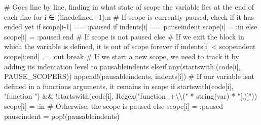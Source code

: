 \documentclass[
  letterpaper,
  DIV=11,
  numbers=noendperiod]{scrreprt}
\newenvironment{Shaded}{\begin{snugshade}}{\end{snugshade}}
\newcommand{\CommentTok}[1]{\textcolor[rgb]{0.37,0.37,0.37}{#1}}
\newcommand{\ControlFlowTok}[1]{\textcolor[rgb]{0.00,0.23,0.31}{#1}}
\newcommand{\FloatTok}[1]{\textcolor[rgb]{0.68,0.00,0.00}{#1}}
\newcommand{\FunctionTok}[1]{\textcolor[rgb]{0.28,0.35,0.67}{#1}}
\newcommand{\KeywordTok}[1]{\textcolor[rgb]{0.00,0.23,0.31}{#1}}
\newcommand{\NormalTok}[1]{\textcolor[rgb]{0.00,0.23,0.31}{#1}}
\newcommand{\OperatorTok}[1]{\textcolor[rgb]{0.37,0.37,0.37}{#1}}
\newcommand{\SpecialCharTok}[1]{\textcolor[rgb]{0.37,0.37,0.37}{#1}}
\newcommand{\StringTok}[1]{\textcolor[rgb]{0.13,0.47,0.30}{#1}}
\begin{document}
\begin{Shaded}
\begin{Highlighting}[]
    \CommentTok{\# Goes line by line, finding in what state of scope the variable lies at the end of each line}
    \ControlFlowTok{for}\NormalTok{ i }\OperatorTok{∈}\NormalTok{ (linedefined}\OperatorTok{+}\FloatTok{1}\NormalTok{)}\OperatorTok{:}\NormalTok{n}
        \CommentTok{\# If scope is currently paused, check if it has ended yet}
        \ControlFlowTok{if}\NormalTok{ scope[i}\OperatorTok{{-}}\FloatTok{1}\NormalTok{] }\OperatorTok{==} \OperatorTok{:}\NormalTok{paused}
            \ControlFlowTok{if}\NormalTok{ indents[i] }\OperatorTok{==}\NormalTok{ pauseindent}
\NormalTok{                scope[i] }\OperatorTok{=} \OperatorTok{:}\KeywordTok{in}
            \ControlFlowTok{else}
\NormalTok{                scope[i] }\OperatorTok{=} \OperatorTok{:}\NormalTok{paused}
            \ControlFlowTok{end}
        \CommentTok{\# If scope is not paused}
        \ControlFlowTok{else}
            \CommentTok{\# If we exit the block in which the variable is defined, it is out of scope forever}
            \ControlFlowTok{if}\NormalTok{ indents[i] }\OperatorTok{\textless{}}\NormalTok{ scopeindent}
\NormalTok{                scope[i}\OperatorTok{:}\KeywordTok{end}\NormalTok{] }\OperatorTok{.=} \OperatorTok{:}\NormalTok{out}
                \ControlFlowTok{break}
            \CommentTok{\# If we start a new scope, we need to track it by adding its indentation level to \textasciigrave{}pausableindents\textasciigrave{}}
            \ControlFlowTok{elseif} \FunctionTok{any}\NormalTok{(}\FunctionTok{startswith}\NormalTok{.(code[i], PAUSE\_SCOPERS))}
                \FunctionTok{append!}\NormalTok{(pausableindents, indents[i])}
                \CommentTok{\# If our variable isn\textquotesingle{}t defined in a function\textquotesingle{}s arguments, it remains in scope}
                \ControlFlowTok{if} \FunctionTok{startswith}\NormalTok{(code[i], }\StringTok{"function "}\NormalTok{) }\OperatorTok{\&\&}
\NormalTok{                    !}\FunctionTok{startswith}\NormalTok{(code[i], }\FunctionTok{Regex}\NormalTok{(}\StringTok{"function .+}\SpecialCharTok{\textbackslash{}\textbackslash{}}\StringTok{("} \OperatorTok{*} \FunctionTok{string}\NormalTok{(var) }\OperatorTok{*} \StringTok{"[,)]"}\NormalTok{))}
\NormalTok{                    scope[i] }\OperatorTok{=} \OperatorTok{:}\KeywordTok{in}                  
                \CommentTok{\# Otherwise, the scope is paused}
                \ControlFlowTok{else}
\NormalTok{                    scope[i] }\OperatorTok{=} \OperatorTok{:}\NormalTok{paused}
\NormalTok{                    pauseindent }\OperatorTok{=} \FunctionTok{pop!}\NormalTok{(pausableindents)}

\end{Highlighting}
\end{Shaded}
\end{document}
